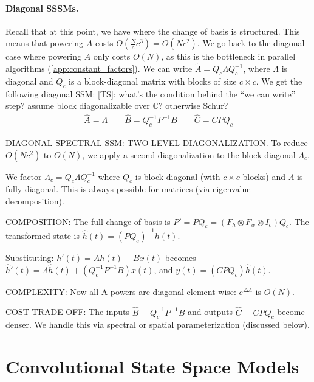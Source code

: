 \documentclass{article}
\newcommand{\TS}[1]{{\color{pink}[TS]: #1}}
\begin{document}
\paragraph{Diagonal SSSMs.} Recall that at this point, we have  where the change of basis is structured. This means that powering $A$ costs $O(\frac{N}{c} c^3) = O(N c^2)$. We go back to the diagonal case where powering $A$ only costs $O(N)$, as this is the bottleneck in parallel algorithms (\cref{app:constant_factors}). We can write $\widetilde{A} = Q_c \Lambda Q_c^{-1}$, where $\Lambda$ is diagonal and $Q_c$ is a block-diagonal matrix with blocks of size $c \!\times\! c$. We get the following diagonal SSM:
\TS{what’s the condition behind the “we can write” step? assume block diagonalizable over $\mathbb{C}$? otherwise Schur?}
%
\begin{align}
\label{eq:ssm:diagonal_spectral}
\widehat{A} = \Lambda \qquad \widehat{B} = Q_c^{-1} P^{-1} B \qquad \widehat{C} = C P Q_c
\end{align}

\begin{thomasbox}
DIAGONAL SPECTRAL SSM: TWO-LEVEL DIAGONALIZATION. To reduce $O(Nc^2)$ to $O(N)$, we apply a second diagonalization to the block-diagonal $\Lambda_c$.

We factor $\Lambda_c = Q_c \Lambda Q_c^{-1}$ where $Q_c$ is block-diagonal (with $c \times c$ blocks) and $\Lambda$ is fully diagonal. This is always possible for matrices (via eigenvalue decomposition).

COMPOSITION: The full change of basis is $P' = P Q_c = (F_h \otimes F_w \otimes I_c) Q_c$. The transformed state is $\widehat{h}(t) = (P Q_c)^{-1} h(t)$.

Substituting: $h'(t) = Ah(t) + Bx(t)$ becomes $\widehat{h}'(t) = \Lambda \widehat{h}(t) + (Q_c^{-1} P^{-1} B) x(t)$, and $y(t) = (CP Q_c) \widehat{h}(t)$.

COMPLEXITY: Now all A-powers are diagonal element-wise: $e^{\Delta \Lambda}$ is $O(N)$.

COST TRADE-OFF: The inputs $\widehat{B} = Q_c^{-1} P^{-1} B$ and outputs $\widehat{C} = CP Q_c$ become denser. We handle this via spectral or spatial parameterization (discussed below).
\end{thomasbox}

\section{Convolutional State Space Models}
\end{document}
